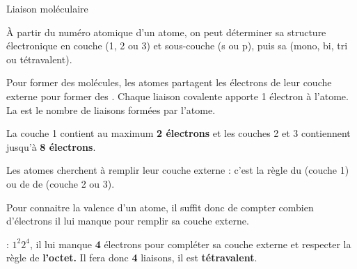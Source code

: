 \begin{doc}{Liaison moléculaire}
  \label{doc:liaison_molecule}

  À partir du numéro atomique d'un atome, on peut déterminer sa structure électronique en couche (1, 2 ou 3) et sous-couche (s ou p), puis sa  (mono, bi, tri ou tétravalent).
  \begin{encart}
    Pour former des molécules, les atomes partagent les électrons de leur couche externe pour former des .
    Chaque liaison covalente apporte 1 électron à l'atome.
    La  est le nombre de liaisons formées par l'atome.
  \end{encart}
  \begin{encart}
    La couche 1 contient au maximum \textbf{2 électrons} et les couches 2 et 3 contiennent jusqu'à \textbf{8 électrons}.
  \end{encart}
  \begin{encart}
    Les atomes cherchent à remplir leur couche externe : c'est la règle du  (couche 1) ou de de  (couche 2 ou 3).
  \end{encart}
  \begin{encart}
    Pour connaitre la valence d'un atome, il suffit donc de compter combien d'électrons il lui manque pour remplir sa couche externe.
  \end{encart}

  \exemple {} : $1^2 2^4$,
  il lui manque \textbf{4} électrons pour compléter sa couche externe et respecter la règle de \textbf{l'octet.}
  Il fera donc \textbf{4} liaisons, il est \textbf{tétravalent}.
\end{doc}


